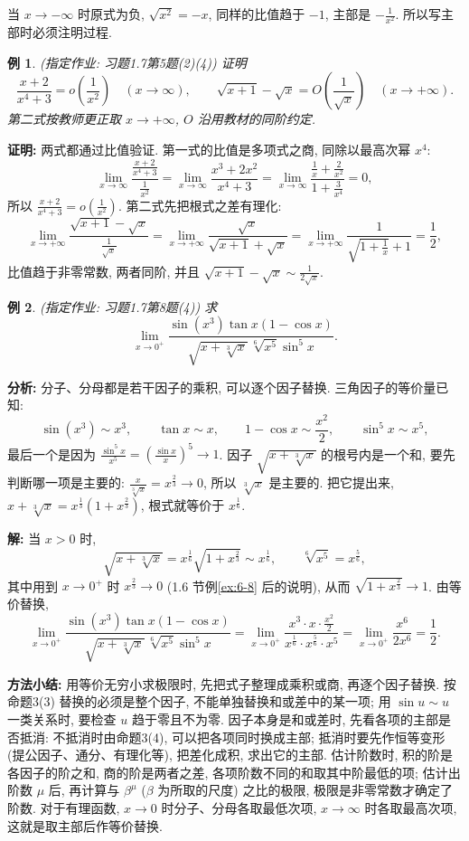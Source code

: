 \documentclass[UTF8,openany]{ctexbook}
\theoremstyle{chinesetextbook}
\newtheorem{example}{例}[section]
\newenvironment{cnproof}{\par\indent\textbf{证明:} \ignorespaces}{\par}
\newenvironment{cnsolution}{\par\indent\textbf{解:} \ignorespaces}{\par}
\begin{document}
当 $x\to-\infty$ 时原式为负, $\sqrt{x^2}=-x$, 同样的比值趋于 $-1$, 主部是 $\displaystyle-\frac1{x^2}$. 所以写主部时必须注明过程.
\begin{example}
\textnormal{(指定作业: 习题1.7第5题(2)(4))} 证明
\[
\frac{x+2}{x^4+3}=o\!\left(\frac1{x^2}\right)\quad(x\to\infty),\qquad\sqrt{x+1}-\sqrt x=O\!\left(\frac1{\sqrt x}\right)\quad(x\to+\infty).
\]
第二式按教师更正取 $x\to+\infty$, $O$ 沿用教材的同阶约定.
\end{example}
\begin{cnproof}
两式都通过比值验证. 第一式的比值是多项式之商, 同除以最高次幂 $x^4$:
\[
\lim_{x\to\infty}\frac{\frac{x+2}{x^4+3}}{\frac1{x^2}}=\lim_{x\to\infty}\frac{x^3+2x^2}{x^4+3}=\lim_{x\to\infty}\frac{\frac1x+\frac2{x^2}}{1+\frac3{x^4}}=0,
\]
所以 $\displaystyle\frac{x+2}{x^4+3}=o\!\left(\frac1{x^2}\right)$. 第二式先把根式之差有理化:
\[
\lim_{x\to+\infty}\frac{\sqrt{x+1}-\sqrt x}{\frac1{\sqrt x}}=\lim_{x\to+\infty}\frac{\sqrt x}{\sqrt{x+1}+\sqrt x}=\lim_{x\to+\infty}\frac1{\sqrt{1+\frac1x}+1}=\frac12,
\]
比值趋于非零常数, 两者同阶, 并且 $\displaystyle\sqrt{x+1}-\sqrt x\sim\frac1{2\sqrt x}$.
\end{cnproof}
\begin{example}
\textnormal{(指定作业: 习题1.7第8题(4))} 求
\[
\lim_{x\to0^+}\frac{\sin(x^3)\tan x(1-\cos x)}{\sqrt{x+\sqrt[3]x}\,\sqrt[6]{x^5}\sin^5x}.
\]
\end{example}
\par\indent\textbf{分析:} 分子、分母都是若干因子的乘积, 可以逐个因子替换. 三角因子的等价量已知:
\[
\sin(x^3)\sim x^3,\qquad\tan x\sim x,\qquad1-\cos x\sim\frac{x^2}2,\qquad\sin^5x\sim x^5,
\]
最后一个是因为 $\displaystyle\frac{\sin^5x}{x^5}=\left(\frac{\sin x}x\right)^5\to1$. 因子 $\sqrt{x+\sqrt[3]x}$ 的根号内是一个和, 要先判断哪一项是主要的: $\displaystyle\frac x{\sqrt[3]x}=x^{\frac23}\to0$, 所以 $\sqrt[3]x$ 是主要的. 把它提出来, $x+\sqrt[3]x=x^{\frac13}\left(1+x^{\frac23}\right)$, 根式就等价于 $x^{\frac16}$.
\begin{cnsolution}
当 $x>0$ 时,
\[
\sqrt{x+\sqrt[3]x}=x^{\frac16}\sqrt{1+x^{\frac23}}\sim x^{\frac16},\qquad\sqrt[6]{x^5}=x^{\frac56},
\]
其中用到 $x\to0^+$ 时 $x^{\frac23}\to0$ (1.6 节例\ref{ex:6-8} 后的说明), 从而 $\sqrt{1+x^{\frac23}}\to1$. 由等价替换,
\[
\lim_{x\to0^+}\frac{\sin(x^3)\tan x(1-\cos x)}{\sqrt{x+\sqrt[3]x}\,\sqrt[6]{x^5}\sin^5x}=\lim_{x\to0^+}\frac{x^3\cdot x\cdot\frac{x^2}2}{x^{\frac16}\cdot x^{\frac56}\cdot x^5}=\lim_{x\to0^+}\frac{x^6}{2x^6}=\frac12.
\]
\end{cnsolution}
\par\indent\textbf{方法小结:} 用等价无穷小求极限时, 先把式子整理成乘积或商, 再逐个因子替换. 按命题3(3) 替换的必须是整个因子, 不能单独替换和或差中的某一项; 用 $\sin u\sim u$ 一类关系时, 要检查 $u$ 趋于零且不为零. 因子本身是和或差时, 先看各项的主部是否抵消: 不抵消时由命题3(4), 可以把各项同时换成主部; 抵消时要先作恒等变形 (提公因子、通分、有理化等), 把差化成积, 求出它的主部. 估计阶数时, 积的阶是各因子的阶之和, 商的阶是两者之差, 各项阶数不同的和取其中阶最低的项; 估计出阶数 $\mu$ 后, 再计算与 $\beta^\mu$ ($\beta$ 为所取的尺度) 之比的极限, 极限是非零常数才确定了阶数. 对于有理函数, $x\to0$ 时分子、分母各取最低次项, $x\to\infty$ 时各取最高次项, 这就是取主部后作等价替换.
\end{document}
